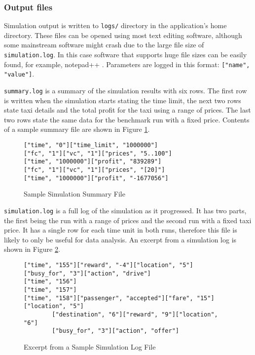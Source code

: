 \subsubsection{Output files}
\label{sec:user_manual:using:output}

Simulation output is written to \texttt{logs/} directory in the application's
home directory. These files can be opened using most text editing software,
although some mainstream software might crash due to the large file size of
\texttt{simulation.log}. In this case software that supports huge file sizes
can be easily found, for example, notepad++ \parencite{Notepad++}. Parameters are logged in this format: \texttt{["name", "value"]}.

\texttt{summary.log} is a summary of the simulation results with six rows. The
first row is written when the simulation starts stating the time limit, the
next two rows state taxi details and the total profit for the taxi using a
range of prices. The last two rows state the same data for the benchmark run
with a fixed price. Contents of a sample summary file are shown in Figure
\ref{figure:output:summary}.

\begin{figure}
  \begin{verbatim}
["time", "0"]["time_limit", "1000000"]
["fc", "1"]["vc", "1"]["prices", "5..100"]
["time", "1000000"]["profit", "839289"]
["fc", "1"]["vc", "1"]["prices", "[20]"]
["time", "1000000"]["profit", "-1677056"]
  \end{verbatim}
\caption{
  Sample Simulation Summary File
  \label{figure:output:summary}
}
\end{figure}

\texttt{simulation.log} is a full log of the simulation as it progressed. It
has two parts, the first being the run with a range of prices and the second
run with a fixed taxi price. It has a single row for each time unit in both
runs, therefore this file is likely to only be useful for data analysis. An
excerpt from a simulation log is shown in Figure \ref{figure:output:log}.

\begin{figure}
  \begin{verbatim}
["time", "155"]["reward", "-4"]["location", "5"]["busy_for", "3"]["action", "drive"]
["time", "156"]
["time", "157"]
["time", "158"]["passenger", "accepted"]["fare", "15"]["location", "5"]
        ["destination", "6"]["reward", "9"]["location", "6"]
        ["busy_for", "3"]["action", "offer"]
  \end{verbatim}
\caption{
  Excerpt from a Sample Simulation Log File
  \label{figure:output:log}
}
\end{figure}

